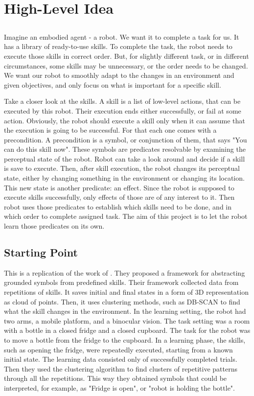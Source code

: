 \section{High-Level Idea} \label{chapter:idea}

\subsection{}
Imagine an embodied agent - a robot. We want it to complete a task for us. It has a library of ready-to-use skills. To complete the task, the robot needs to execute those skills in correct order. But, for slightly different task, or in different circumstances, some skills may be unnecessary, or the order needs to be changed. We want our robot to smoothly adapt to the changes in an environment and given objectives, and only focus on what is important for a specific skill. 

Take a closer look at the skills. A skill is a list of low-level actions, that can be executed by this robot. Their execution ends either successfully, or fail at some action. Obviously, the robot should execute a skill only when it can assume that the execution is going to be successful. For that each one comes with a precondition. A precondition is a symbol, or conjunction of them, that says "You can do this skill now". These symbols are predicates resolvable by examining the perceptual state of the robot. Robot can take a look around and decide if a skill is save to execute. Then, after skill execution, the robot changes its perceptual state, either by changing something in the environment or changing its location. This new state is another predicate: an effect. Since the robot is supposed to execute skills successfully, only effects of those are of any interest to it. Then robot uses those predicates to establish which skills need to be done, and in which order to complete assigned task. The aim of this project is to let the robot learn those predicates on its own.

\subsection{Starting Point}
This is a replication of the work of \textcite{konidaris2018skills}. They proposed a framework for abstracting grounded symbols from predefined skills. Their framework collected data from repetitions of skills. It saves initial and final states in a form of 3D representation as cloud of points. Then, it uses clustering methods, such as DB-SCAN to find what the skill changes in the environment. In the learning setting, the robot had two arms, a mobile platform, and a binocular vision. The task setting was a room with a bottle in a closed fridge and a closed cupboard. The task for the robot was to move a bottle from the fridge to the cupboard. In a learning phase, the skills, such as opening the fridge, were repeatedly executed, starting from a known initial state. The learning data consisted only of successfully completed trials. Then they used the clustering algorithm to find clusters of repetitive patterns through all the repetitions. This way they obtained symbols that could be interpreted, for example, as "Fridge is open", or "robot is holding the bottle". 

